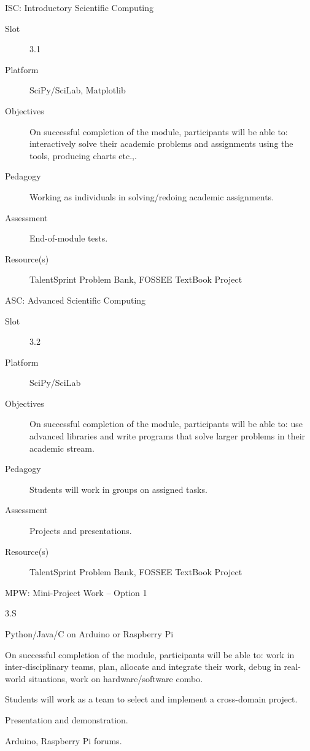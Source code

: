 \documentclass[12pt]{beamer}
\begin{document}
{\begin{frame}{ISC: Introductory Scientific Computing}
  \begin{description}
   \item[Slot] 3.1 
  \item[Platform] SciPy/SciLab, Matplotlib
  \item[Objectives] On successful completion of the module, participants will be able to: interactively solve their academic problems and assignments using the tools, producing charts etc.,.
  \item[Pedagogy] Working as individuals in solving/redoing academic assignments.
  \item[Assessment] End-of-module tests.
  \item[Resource(s)] TalentSprint Problem Bank, FOSSEE TextBook Project
  \end{description}
\end{frame}

\begin{frame}{ASC: Advanced Scientific Computing}
  \begin{description}
    \item[Slot] 3.2
  \item[Platform] SciPy/SciLab
  \item[Objectives] On successful completion of the module, participants will be able to: use advanced libraries and write programs that solve larger problems in their academic stream.
  \item[Pedagogy] Students will work in groups on assigned tasks.
  \item[Assessment] Projects and presentations.
  \item[Resource(s)] TalentSprint Problem Bank, FOSSEE TextBook Project
  \end{description}
\end{frame}

\begin{frame}{MPW: Mini-Project Work -- Option 1}
  \begin{description}[Resource(S)]
    \item[Slot] 3.S
  \item[Platform] Python/Java/C on Arduino or Raspberry Pi
  \item[Objectives] On successful completion of the module, participants will be able to: work in inter-disciplinary teams, plan, allocate and integrate their work, debug in real-world situations, work on hardware/software combo.
  \item[Pedagogy] Students will work as a team to select and implement a cross-domain project.
  \item[Assessment] Presentation and demonstration.
  \item[Resource(s)] Arduino, Raspberry Pi forums.
  \end{description}
\end{frame}

}
\end{document}
